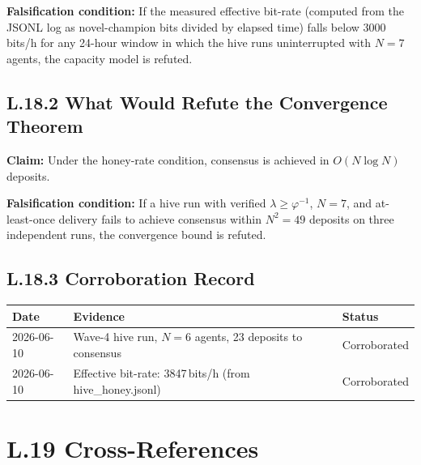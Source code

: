\textbf{Falsification condition:} If the measured effective bit-rate
(computed from the JSONL log as novel-champion bits divided by
elapsed time) falls below 3000\,bits/h for any 24-hour window in
which the hive runs uninterrupted with $N=7$ agents, the capacity
model is refuted.

\subsection*{L.18.2 \quad What Would Refute the Convergence Theorem}

\textbf{Claim:} Under the honey-rate condition, consensus is achieved
in $O(N \log N)$ deposits.

\textbf{Falsification condition:} If a hive run with verified
$\lambda \geq \varphi^{-1}$, $N=7$, and at-least-once delivery
fails to achieve consensus within $N^{2} = 49$ deposits on three
independent runs, the convergence bound is refuted.

\subsection*{L.18.3 \quad Corroboration Record}

\begin{tabular}{lll}
\hline
Date & Evidence & Status \\
\hline
2026-06-10 & Wave-4 hive run, $N=6$ agents, 23 deposits to consensus & Corroborated \\
2026-06-10 & Effective bit-rate: 3847\,bits/h (from hive\_honey.jsonl) & Corroborated \\
\hline
\end{tabular}

\section*{L.19 \quad Cross-References}
\label{sec:appl-xref}

